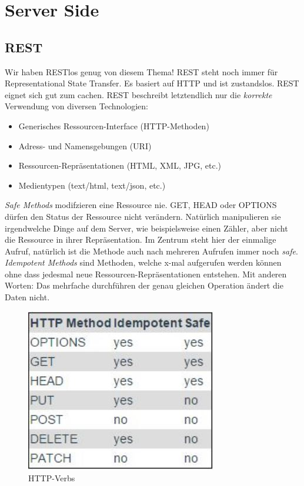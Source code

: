 \chapter{Server Side}

\section{REST}
Wir haben RESTlos genug von diesem Thema! REST steht noch immer für Representational State Transfer. Es basiert auf HTTP und ist zustandslos. REST eignet sich gut zum cachen. REST beschreibt letztendlich nur die \emph{korrekte} Verwendung von diversen Technologien:

\begin{itemize}
	\item Generisches Ressourcen-Interface (HTTP-Methoden)
	\item Adress- und Namensgebungen (URI)
	\item Ressourcen-Repräsentationen (HTML, XML, JPG, etc.)
	\item Medientypen (text/html, text/json, etc.)	
\end{itemize}

\emph{Safe Methods} modifzieren eine Ressource nie. GET, HEAD oder OPTIONS dürfen den Status der Ressource nicht verändern. Natürlich manipulieren sie irgendwelche Dinge auf dem Server, wie beispielsweise einen Zähler, aber nicht die Ressource in ihrer Repräsentation. Im Zentrum steht hier der einmalige Aufruf, natürlich ist die Methode auch nach mehreren Aufrufen immer noch \emph{safe}. \emph{Idempotent Methods} sind Methoden, welche x-mal aufgerufen werden können ohne dass jedesmal neue Ressourcen-Repräsentationen entstehen. Mit anderen Worten: Das mehrfache durchführen der genau gleichen Operation ändert die Daten nicht.

\begin{figure}[h!]
\centering
\includegraphics[width=0.5\linewidth]{fig/http-verbs}
\caption{HTTP-Verbs}
\label{fig:http-verbs}
\end{figure}

